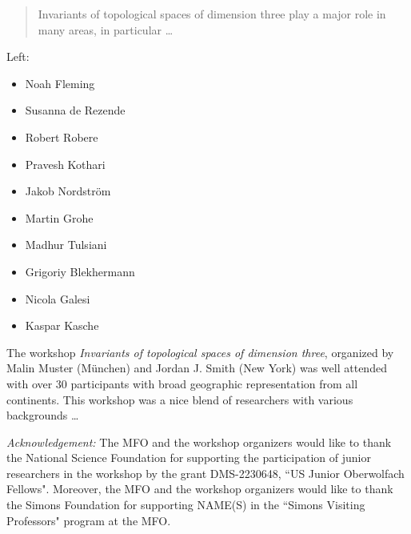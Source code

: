 \documentclass[report]{owrart}
\begin{document}
\begin{abstract}

\noindent
Invariants of topological spaces of dimension three play a major role
in many areas, in particular \dots
\end{abstract}

\maketitle

\begin{introduction}

Left:
\begin{itemize}
  \item Noah Fleming 
  \item Susanna de Rezende
  \item Robert Robere 
  \item Pravesh Kothari 
  \item Jakob Nordstr\"{o}m
  \item Martin Grohe 
  \item Madhur Tulsiani
  \item Grigoriy Blekhermann
  \item Nicola Galesi
  \item Kaspar Kasche
\end{itemize}


\noindent
The workshop \emph{Invariants of topological spaces of dimension three},
organized by Malin Muster (M\"unchen) and Jordan J. Smith (New York)
was well attended with over 30 participants with broad geographic
representation from all continents. This workshop was a nice blend of
researchers with various backgrounds \dots

\medskip\noindent
{\em Acknowledgement:} The MFO and the workshop organizers would like to thank
 the National Science Foundation for supporting the participation of junior
 researchers in the workshop by the grant DMS-2230648, ``US Junior Oberwolfach Fellows".
 Moreover, the MFO and the workshop organizers would like to thank the Simons Foundation
 for supporting NAME(S) in the ``Simons Visiting Professors" program at the MFO.
\end{introduction}



\tableofcontents
\end{document}
